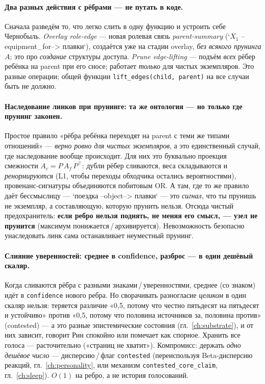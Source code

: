 \paragraph{Два разных действия с рёбрами — не путать в коде.} Сначала разведём то, что
легко слить в одну функцию и устроить себе Чернобыль. \emph{Overlay role-edge} — новая
ролевая связь \emph{parent-summary} (`$X_1$ --equipment\_for--> плавки`), создаётся уже
на стадии overlay, \emph{без всякого прунинга} $A$; это про \emph{создание} структуры
доступа. \emph{Prune edge-lifting} — подъём \emph{всех} рёбер ребёнка на parent при его
сносе; работает \emph{только} для чистых экземпляров. Это разные операции; общей функции
\texttt{lift\_edges(child, parent)} на все случаи быть не должно.

\paragraph{Наследование линков при прунинге: та же онтология — но только где прунинг законен.}
Простое правило «рёбра ребёнка переходят на parent с теми же типами отношений» —
\emph{верно ровно для чистых экземпляров}, а это единственный случай, где наследование
вообще происходит. Для них это буквально проекция смежности $A_c=P\,A_f\,P^\top$: дубли
рёбер сливаются, веса складываются и \emph{ренормируются} (L1, чтобы переходы обходчика
остались вероятностями), провенанс-сигнатуры объединяются побитовым OR. А там, где то
же правило даёт бессмыслицу — `поездка --object--> плавки` — это \emph{сигнал}, что ты
прунишь не экземпляр, а составляющую, которую прунить нельзя. Отсюда чистый
предохранитель: \textbf{если ребро нельзя поднять, не меняя его смысл, — узел не
прунится} (максимум понижается\,/\,архивируется). Невозможность безопасно унаследовать
линк сама останавливает неуместный прунинг.

\paragraph{Слияние уверенностей: среднее в confidence, разброс — в один дешёвый скаляр.}
Когда сливаются рёбра с разными знаками\,/\,уверенностями, среднее (со знаком) идёт в
\texttt{confidence} нового ребра. Но сворачивать разногласие \emph{целиком} в один
скаляр нельзя: теряется различие «0,5, потому что честно пятьдесят на пятьдесят и
устойчиво» против «0,5, потому что половина источников за, половина против» (contested)
— а это разные эпистемические состояния (гл.~\ref{ch:substrate}), и от них зависит,
говорит Рин спокойно или помечает как спорное. Хранить все голоса — расточительно
(«страниц не хватит»). Компромисс: держать \emph{одно дешёвое число} — дисперсию\,/\,флаг
\texttt{contested} (переиспользуя Beta-дисперсию реакций, гл.~\ref{ch:personality}, или
механизм \texttt{contested\_core\_claim}, гл.~\ref{ch:sleep}). $O(1)$ на ребро, а не
история голосований.

